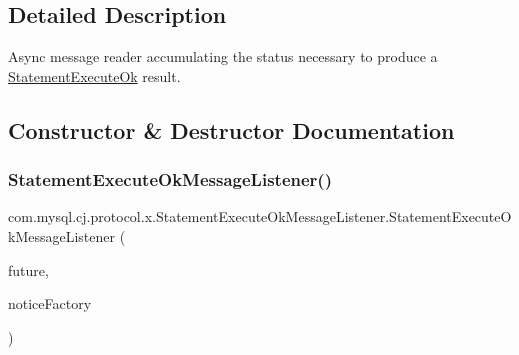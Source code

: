 \subsection{Detailed Description}
Async message reader accumulating the status necessary to produce a \mbox{\hyperlink{classcom_1_1mysql_1_1cj_1_1protocol_1_1x_1_1_statement_execute_ok}{Statement\+Execute\+Ok}} result. 

\subsection{Constructor \& Destructor Documentation}
\mbox{\label{classcom_1_1mysql_1_1cj_1_1protocol_1_1x_1_1_statement_execute_ok_message_listener_adde803d9a59bfb47ff7a43941d375655}} 
\subsubsection{\texorpdfstring{Statement\+Execute\+Ok\+Message\+Listener()}{StatementExecuteOkMessageListener()}}
{\footnotesize\ttfamily com.\+mysql.\+cj.\+protocol.\+x.\+Statement\+Execute\+Ok\+Message\+Listener.\+Statement\+Execute\+Ok\+Message\+Listener (\begin{DoxyParamCaption}\item[{Completable\+Future$<$ \mbox{\hyperlink{classcom_1_1mysql_1_1cj_1_1protocol_1_1x_1_1_statement_execute_ok}{Statement\+Execute\+Ok}} $>$}]{future,  }\item[{\mbox{\hyperlink{interfacecom_1_1mysql_1_1cj_1_1protocol_1_1_protocol_entity_factory}{Protocol\+Entity\+Factory}}$<$ \mbox{\hyperlink{classcom_1_1mysql_1_1cj_1_1protocol_1_1x_1_1_notice}{Notice}}, \mbox{\hyperlink{classcom_1_1mysql_1_1cj_1_1protocol_1_1x_1_1_x_message}{X\+Message}} $>$}]{notice\+Factory }\end{DoxyParamCaption})}



